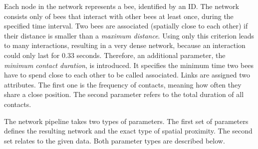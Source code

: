 Each node in the network represents a bee, identified by an ID.
The network consists only of bees that interact with other bees at least once, during the specified time interval.
Two bees are associated (spatially close to each other) if their distance is smaller than a \emph{maximum distance}.
Using only this criterion leads to many interactions, resulting in a very dense network, because an interaction could only last for 0.33 seconds.
Therefore, an additional parameter, the \emph{minimum contact duration}, is introduced.
It specifies the minimum time two bees have to spend close to each other to be called associated.
Links are assigned two attributes.
The first one is the frequency of contacts, meaning how often they share a close position. The second parameter refers to the total duration of all contacts.

The network pipeline takes two types of parameters. The first set of parameters defines the resulting network and the exact type of spatial proximity. The second set relates to the given data. Both parameter types are described below.\\


